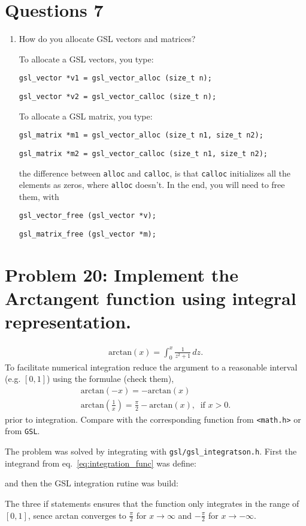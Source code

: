 \documentclass[10pt]{article}
\begin{document}
	\section*{Questions 7}
	\begin{enumerate}
		\item How do you allocate GSL vectors and matrices?
		
		To allocate a GSL vectors, you type:

		\texttt{gsl\_vector *v1 = gsl\_vector\_alloc (size\_t n);}

		\texttt{gsl\_vector *v2 = gsl\_vector\_calloc (size\_t n);}

		To allocate a GSL matrix, you type:

		\texttt{gsl\_matrix *m1 = gsl\_vector\_alloc (size\_t n1, size\_t n2);}

		\texttt{gsl\_matrix *m2 = gsl\_vector\_calloc (size\_t n1, size\_t n2);}

		the difference between \texttt{alloc} and \texttt{calloc}, is that \texttt{calloc} initializes all the elements as zeros, where \texttt{alloc} doesn't.
		In the end, you will need to free them, with

		\texttt{gsl\_vector\_free (gsl\_vector *v);}

		\texttt{gsl\_matrix\_free (gsl\_vector *m);}
		
	\end{enumerate}
	\section*{Problem 20: Implement the Arctangent function using integral representation.}
	\begin{align}
		\mathrm{arctan}(x) 
		= \int_{0}^{x} \frac{1}{z^2+1} \, dz. \label{eq:integration_func}
	\end{align}
	To facilitate numerical integration reduce the argument to a reasonable interval (e.g. $[0,1]$) using the formulae (check them),
	\begin{align}
		\mathrm{arctan}(-x) = -\mathrm{arctan}(x) \\
		\mathrm{arctan}\!\left(\frac{1}{x}\right) =
		\frac{\pi}{2} - \mathrm{arctan}(x), \ \text{ if } x > 0.
	\end{align}
	prior to integration. Compare with the corresponding function from \texttt{<math.h>} or from \texttt{GSL}.
	
	The problem was solved by integrating with \texttt{gsl/gsl\_integratson.h}. First the integrand from eq.~\ref{eq:integration_func} was define:
	
	 and then the GSL integration rutine was build:
	
	The three if statements ensures that the function only integrates in the range of $[0,1]$, sence arctan converges to $\frac{\pi}{2}$ for $x \to \infty$ and $-\frac{\pi}{2}$ for $x \to -\infty$.
	
\end{document}
